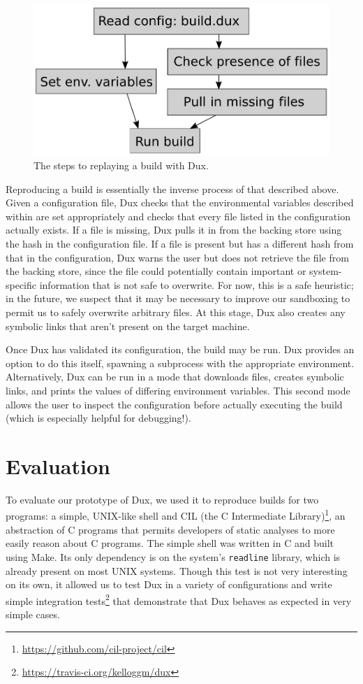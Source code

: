 \documentclass[10pt,conference]{IEEEtran}
\begin{document}
\begin{figure}
\includegraphics[width=\columnwidth]{duxcheck}
\caption{The steps to replaying a build with Dux.}
\end{figure}

Reproducing a build is essentially the inverse process of that described above. Given a configuration file,
Dux checks that the environmental variables described within are set appropriately and checks that every
file listed in the configuration actually exists. If a file is missing, Dux pulls it in from the backing store
using the hash in the configuration file. If a file is present but has a different hash from that
in the configuration, Dux warns the user but does not retrieve the file from the backing store, since the file
could potentially contain important or system-specific information that is not safe to overwrite. For now,
this is a safe heuristic; in the future, we suspect that it may be necessary to improve our sandboxing to permit
us to safely overwrite arbitrary files. At this stage, Dux also creates any symbolic links that aren't present
on the target machine.

Once Dux has validated its configuration, the build may be run. Dux provides an option to do this itself, spawning
a subprocess with the appropriate environment. Alternatively, Dux can be run in a mode that downloads files,
creates symbolic links, and prints the values of differing environment variables. This second mode allows the user
to inspect the configuration before actually executing the build (which is especially helpful for debugging!).

\section{Evaluation}

To evaluate our prototype of Dux, we used it to reproduce builds for two programs: a simple, UNIX-like shell and
CIL (the C Intermediate Library)\footnote{\url{https://github.com/cil-project/cil}}, an abstraction of C programs
that permits developers of static analyses to more easily reason about C programs. The simple shell was written in
C and built using Make. Its only dependency is on the system's \texttt{readline} library, which is already
present on most UNIX systems. Though this test is not very interesting on its own, it allowed us to test Dux in
a variety of configurations and write simple integration tests\footnote{\url{https://travis-ci.org/kelloggm/dux}}
that demonstrate that Dux behaves as expected in very simple cases.
\end{document}
